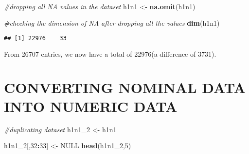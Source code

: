 \documentclass[
]{article}
\newenvironment{Shaded}{\begin{snugshade}}{\end{snugshade}}
\newcommand{\CommentTok}[1]{\textcolor[rgb]{0.56,0.35,0.01}{\textit{#1}}}
\newcommand{\ConstantTok}[1]{\textcolor[rgb]{0.56,0.35,0.01}{#1}}
\newcommand{\DecValTok}[1]{\textcolor[rgb]{0.00,0.00,0.81}{#1}}
\newcommand{\FunctionTok}[1]{\textcolor[rgb]{0.13,0.29,0.53}{\textbf{#1}}}
\newcommand{\NormalTok}[1]{#1}
\newcommand{\OtherTok}[1]{\textcolor[rgb]{0.56,0.35,0.01}{#1}}
\newcommand{\SpecialCharTok}[1]{\textcolor[rgb]{0.81,0.36,0.00}{\textbf{#1}}}
\begin{document}
\begin{Shaded}
\end{Shaded}

\begin{Shaded}
\begin{Highlighting}[]
\CommentTok{\#dropping all NA values in the dataset}
\NormalTok{h1n1 }\OtherTok{\textless{}{-}} \FunctionTok{na.omit}\NormalTok{(h1n1)}

\CommentTok{\#checking the dimension of NA after dropping all the values}
\FunctionTok{dim}\NormalTok{(h1n1)}
\end{Highlighting}
\end{Shaded}

\begin{verbatim}
## [1] 22976    33
\end{verbatim}

From 26707 entries, we now have a total of 22976(a difference of 3731).

\section{CONVERTING NOMINAL DATA INTO NUMERIC
DATA}\label{converting-nominal-data-into-numeric-data}

\begin{Shaded}
\begin{Highlighting}[]
\CommentTok{\#duplicating dataset}
\NormalTok{h1n1\_2 }\OtherTok{\textless{}{-}}\NormalTok{ h1n1}

\NormalTok{h1n1\_2[,}\DecValTok{32}\SpecialCharTok{:}\DecValTok{33}\NormalTok{] }\OtherTok{\textless{}{-}} \ConstantTok{NULL}
\FunctionTok{head}\NormalTok{(h1n1\_2,}\DecValTok{5}\NormalTok{)}
\end{Highlighting}
\end{Shaded}
\end{document}
